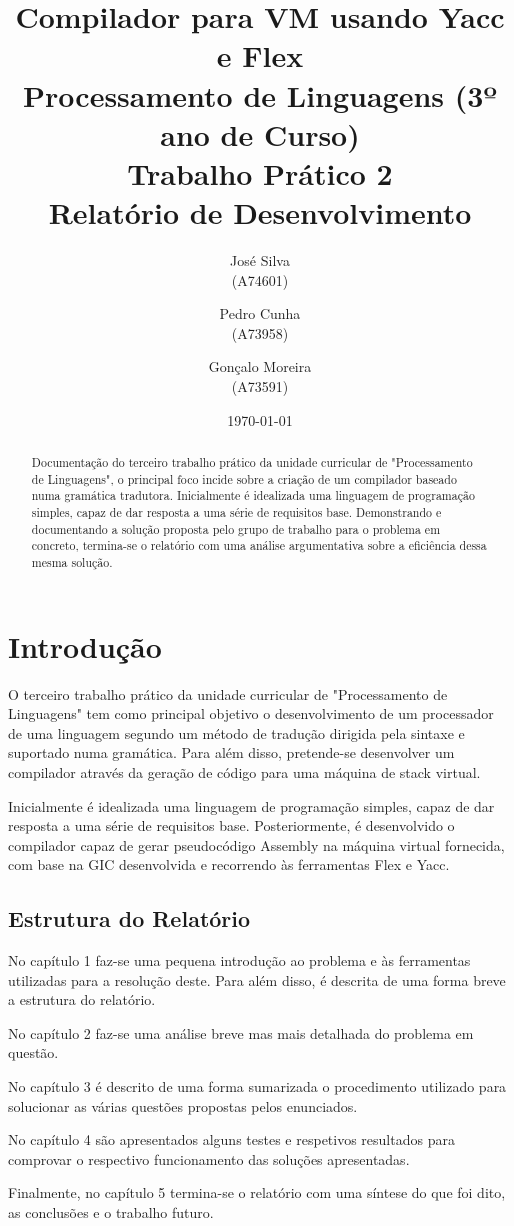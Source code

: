 \documentclass{report}
\title{\textbf{Compilador para VM usando Yacc e Flex} \\ Processamento de Linguagens (3º ano de Curso)\\ \textbf{Trabalho Prático 2}\\ Relatório de Desenvolvimento}
\author{José Silva\\ (A74601) \and Pedro Cunha\\ (A73958) \and Gonçalo Moreira\\ (A73591) }
\date{\today}
\begin{document}
\maketitle

\begin{abstract}
Documentação do terceiro trabalho prático da unidade curricular de "Processamento de Linguagens", o principal foco incide sobre a criação de um compilador baseado numa gramática tradutora. Inicialmente é idealizada uma linguagem de programação simples, capaz de dar resposta a uma série de requisitos base.
Demonstrando e documentando a solução proposta pelo grupo de trabalho para o problema em concreto, termina-se o relatório com uma análise argumentativa sobre a eficiência dessa mesma solução.

\end{abstract}

\tableofcontents


\chapter{Introdução} \label{intro}


O terceiro trabalho prático da unidade curricular de "Processamento de Linguagens" tem como principal objetivo o desenvolvimento de um processador de uma linguagem segundo um método de tradução dirigida pela sintaxe e suportado numa gramática. Para além disso,  pretende-se  desenvolver  um compilador através da geração de código para uma máquina de stack virtual. 
 
 
Inicialmente é idealizada uma linguagem de programação simples, capaz de dar resposta a uma série de requisitos base. Posteriormente, é desenvolvido o compilador  capaz de gerar pseudocódigo Assembly na máquina virtual fornecida, com base na GIC desenvolvida e recorrendo às ferramentas Flex e Yacc. 
 



\section*{Estrutura do Relatório} 

No capítulo 1 faz-se uma pequena introdução ao problema e às ferramentas utilizadas para a resolução deste. Para além disso, é descrita de uma forma breve a estrutura do relatório.\par
No capítulo 2 faz-se uma análise breve mas mais detalhada do problema em questão.\par
No capítulo 3 é descrito de uma forma sumarizada o procedimento utilizado para solucionar as várias questões propostas pelos enunciados.\par
No capítulo 4 são apresentados alguns testes e respetivos resultados para comprovar o respectivo funcionamento das soluções apresentadas.\par
Finalmente, no capítulo 5 termina-se o relatório com uma síntese do que foi dito, as conclusões e o trabalho futuro.
\end{document}
